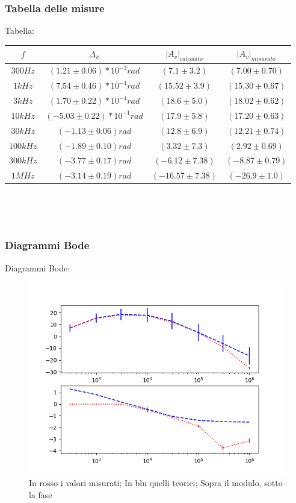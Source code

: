 \documentclass{article}
\begin{document}
\subsubsection{Tabella delle misure}
Tabella:
\begin{table}[!h]
\centering
\label{my-label}
\renewcommand{\arraystretch}{1.5}
\begin{tabular}{|c|c|c|c|}
\hline $f$ & $\Delta_\phi$ & ${|A_v|}_{calcolato}$ & ${|A_v|}_{misurato}$
\\
\hline $300Hz$ & $(1.21 \pm 0.06)*10^{-3} rad$ & $(7.1 \pm 3.2) $ & $ (7.00 \pm 0.70) $\\
\hline $1kHz$ & $(7.54 \pm 0.46)*10^{-4} rad$ & $(15.52 \pm 3.9)$ & $ (15.30 \pm 0.67) $\\
\hline $3kHz$ & $(1.70 \pm 0.22)*10^{-4} rad$ & $(18.6 \pm 5.0)$ & $ (18.02 \pm 0.62) $\\
\hline $10kHz$ & $(-5.03 \pm 0.22)*10^{-1} rad$ & $(17.9 \pm 5.8)$ & $ (17.20 \pm 0.63) $\\
\hline $30kHz$ & $(-1.13 \pm 0.06) rad$ & $(12.8 \pm 6.9)$ & $ (12.21 \pm 0.74) $\\
\hline $100kHz$ & $(-1.89 \pm 0.10) rad$ & $(3.32 \pm 7.3)$ & $ (2.92 \pm 0.69) $\\
\hline $300kHz$ & $(-3.77 \pm 0.17) rad$ & $(-6.12 \pm 7.38)$ & $ (-8.87 \pm 0.79) $\\
\hline $1MHz$ & $(-3.14 \pm 0.19) rad$ & $(-16.57 \pm 7.38)$ & $ (-26.9 \pm 1.0) $\\
\hline
\end{tabular}
\\
\end{table}
\\

\subsubsection{Diagrammi Bode}
Diagrammi Bode:
\begin{figure}[!h]
  \includegraphics[width=\textwidth]{Bode.png}
  \caption{In rosso i valori misurati; In blu quelli teorici; Sopra il modulo, sotto la fase}
  \label{fig:bode1}
\end{figure}
\end{document}
